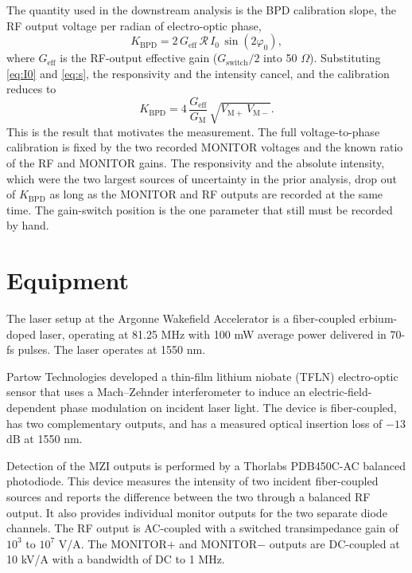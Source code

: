 \documentclass[11pt]{article}
\newcommand{\Iz}{I_{0}}
\newcommand{\phz}{\varphi_{0}}
\newcommand{\Vp}{V_{\mathrm{M+}}}
\newcommand{\Vm}{V_{\mathrm{M-}}}
\newcommand{\Resp}{\mathcal{R}}
\begin{document}
The quantity used in the downstream analysis is the BPD calibration slope, the RF output
voltage per radian of electro-optic phase,
\begin{equation}
  K_{\mathrm{BPD}} = 2\,G_{\mathrm{eff}}\,\Resp\,\Iz\,\sin(2\phz),
\end{equation}
where $G_{\mathrm{eff}}$ is the RF-output effective gain ($G_{\mathrm{switch}}/2$ into
50 $\Omega$). Substituting \eqref{eq:I0} and \eqref{eq:s}, the responsivity and the
intensity cancel, and the calibration reduces to
\begin{equation}
  K_{\mathrm{BPD}} = 4\,\frac{G_{\mathrm{eff}}}{G_{\mathrm{M}}}\,\sqrt{\Vp\,\Vm}.
  \label{eq:Kbox}
\end{equation}
This is the result that motivates the measurement. The full voltage-to-phase calibration
is fixed by the two recorded MONITOR voltages and the known ratio of the RF and MONITOR
gains. The responsivity and the absolute intensity, which were the two largest sources
of uncertainty in the prior analysis, drop out of $K_{\mathrm{BPD}}$ as long as the
MONITOR and RF outputs are recorded at the same time. The gain-switch position is the
one parameter that still must be recorded by hand.

\section{Equipment}

The laser setup at the Argonne Wakefield Accelerator is a fiber-coupled erbium-doped
laser, operating at 81.25 MHz with 100 mW average power delivered in 70-fs pulses. The
laser operates at 1550 nm.

Partow Technologies developed a thin-film lithium niobate (TFLN) electro-optic sensor
that uses a Mach--Zehnder interferometer to induce an electric-field-dependent phase
modulation on incident laser light. The device is fiber-coupled, has two complementary
outputs, and has a measured optical insertion loss of $-13$ dB at 1550 nm.

Detection of the MZI outputs is performed by a Thorlabs PDB450C-AC balanced photodiode.
This device measures the intensity of two incident fiber-coupled sources and reports the
difference between the two through a balanced RF output. It also provides individual
monitor outputs for the two separate diode channels. The RF output is AC-coupled with a
switched transimpedance gain of $10^{3}$ to $10^{7}$ V/A. The MONITOR$+$ and MONITOR$-$
outputs are DC-coupled at 10 kV/A with a bandwidth of DC to 1 MHz.
\end{document}

